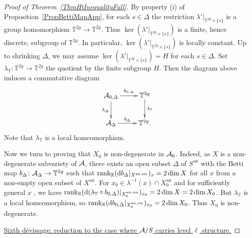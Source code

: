\begin{proof}[Proof of Theorem~\ref{ThmHtInequalityFull}]
By property (i) of Proposition~\ref{PropBettiMapApp}, for each $s \in \Delta$ the restriction $\lambda'|_{\mathbb{T}^{2g} \times \{s\}}$ is a group homomorphism $\mathbb{T}^{2g}  \rightarrow  \mathbb{T}^{2g}$. Thus $\ker(\lambda'|_{\mathbb{T}^{2g} \times \{s\}})$ is a finite, hence discrete, subgroup of $\mathbb{T}^{2g}$. In particular, $\ker(\lambda'|_{\mathbb{T}^{2g} \times \{s\}})$ is locally constant. Up to shrinking $\Delta$, we may assume $\ker(\lambda'|_{\mathbb{T}^{2g} \times \{s\}}) = H$ for each $s \in \Delta$. Set $\lambda_{\mathbb{T}} \colon \mathbb{T}^{2g} \rightarrow \mathbb{T}^{2g}$ the quotient by the finite subgroup $H$. 
Then the diagram above induces a commutative diagram
\begin{equation}
\xymatrix{
\cA_{0,\Delta} \ar[r]^-{b_{0,\Delta}} \ar[d]_-{\lambda_{\Delta}} & \mathbb{T}^{2g} \ar[d]^-{\lambda_{\mathbb{T}}} \\
\cA_{\Delta} \ar[r]^-{b_{\Delta}} & \mathbb{T}^{2g}.
}
\end{equation}
Note that $\lambda_{\mathbb{T}}$ is a local homeomorphism.


Now we turn to proving that $X_0$ is non-degenerate in $\mathcal{A}_0$. Indeed, as $X$ is a non-degenerate subvariety of $\mathcal{A}$, there exists an open subset $\Delta$ of $S^{\mathrm{an}}$ with the Betti map $b_{\Delta} \colon \mathcal{A}_{\Delta} \rightarrow \mathbb{T}^{2g}$ such that $\mathrm{rank}_{{\mathbb{R}}}(\mathrm{d}b_{\Delta}|_{X^{\mathrm{an,sm}}})_x = 2 \dim X$ for all $x$ from a non-empty open subset of $X^{\mathrm{an}}$. For $x_0 \in  \lambda^{-1}(x)\cap X_0^{\mathrm{an}}$
 and for sufficiently general $x$%
, we have 
$\mathrm{rank}_{{\mathbb{R}}}(\mathrm{d}(\lambda_{\mathbb{T}}\circ b_{0,\Delta})|_{X_0^{\mathrm{an,sm}}})_{x_0} = 2 \dim X = 2 \dim X_0$. But $\lambda_{\mathbb{T}}$ is a local homeomorphism, so $\mathrm{rank}_{{\mathbb{R}}}(\mathrm{d} b_{0,\Delta}|_{X_0^{\mathrm{an,sm}}})_{x_0} = 2 \dim X_0$. Thus $X_0$ is non-degenerate.





\ul{Sixth d\'{e}vissage: reduction to the case where $\mathcal{A}/S$
  carries level $\ell$ structure.}


\end{proof}
